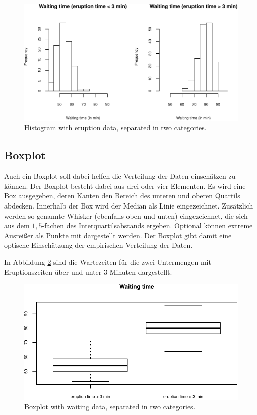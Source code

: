 \documentclass[10pt,]{article}
\begin{document}
\begin{figure}[htbp]
\centering
\includegraphics{project1_files/figure-latex/histograms 2-1.pdf}
\caption{Histogram with eruption data, separated in two
categories.\label{fig:histoSep}}
\end{figure}

\subsection{Boxplot}\label{boxplot}

Auch ein Boxplot soll dabei helfen die Verteilung der Daten einschätzen
zu können. Der Boxplot besteht dabei aus drei oder vier Elementen. Es
wird eine Box ausgegeben, deren Kanten den Bereich des unteren und
oberen Quartils abdecken. Innerhalb der Box wird der Median als Linie
eingezeichnet. Zusätzlich werden so genannte Whisker (ebenfalls oben und
unten) eingezeichnet, die sich aus dem \(1,5\)-fachen des
Interquartilsabstands ergeben. Optional können extreme Ausreißer als
Punkte mit dargestellt werden. Der Boxplot gibt damit eine optische
Einschätzung der empirischen Verteilung der Daten.

In Abbildung \ref{fig:box} sind die Wartezeiten für die zwei Untermengen
mit Eruptionszeiten über und unter 3 Minuten dargestellt.

\begin{figure}[htbp]
\centering
\includegraphics{project1_files/figure-latex/boxplot-1.pdf}
\caption{Boxplot with waiting data, separated in two
categories.\label{fig:box}}
\end{figure}
\end{document}
